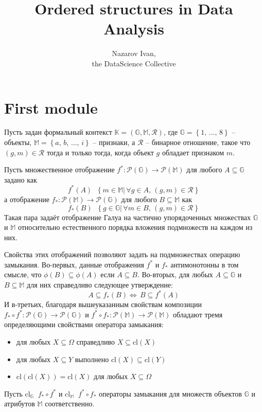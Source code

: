 \documentclass[a4paper]{article}
\title{Ordered structures in Data Analysis}
\author{Nazarov Ivan, \rus{101мНОД(ИССА)}\\the DataScience Collective}
\newcommand{\obj}[1]{{\left\{ #1 \right \}}}
\newcommand{\brac}[1]{{\left ( #1 \right )}}
\newcommand{\induc}[1]{{\left . #1 \right \vert}}
\newcommand{\Pwr}{\mathcal{P}}
\newcommand{\Ctx}{\mathbb{K}}
\newcommand{\defn}{\mathop{\overset{\Delta}{=}}\nolimits}
\begin{document}
\maketitle

\part{First module} %
\label{prt:first_module}

Пусть задан формальный контекст $\Ctx = \brac{\mathbb{G}, \mathbb{M}, \mathcal{R}}$, где $\mathbb{G} = \obj{1,\,\dots,\,8}$ -- объекты, $\mathbb{M} = \obj{a,\,b,\,\ldots,\,i}$ -- признаки, а $\mathcal{R}$ -- бинарное отношение, такое что $(g,m)\in \mathcal{R}$ тогда и только тогда, когда объект $g$ обладает признаком $m$.

Пусть множественное отображение $f^*:\Pwr(\mathbb{G})\to \Pwr(\mathbb{M})$ для любого $A\subseteq \mathbb{G}$ задано как \[f^*\brac{A}\defn \obj{\induc{ m\in \mathbb{M} }\,\forall g\in A,\,\brac{g,m}\in \mathcal{R}}\] а отображение $f_*:\Pwr(\mathbb{M})\to \Pwr(\mathbb{G})$ для любого $B\subseteq \mathbb{M}$ как \[f_*\brac{B}\defn \obj{\induc{ g\in \mathbb{G} }\,\forall m\in B,\,\brac{g,m}\in \mathcal{R}}\] Такая пара задаёт отображение Галуа на частично упорядоченных множествах $\mathbb{G}$ и $\mathbb{M}$ относительно естественного порядка вложения подмножеств на каждом из них.

Свойства этих отображений позволяют задать на подмножествах операцию замыкания. Во-первых, данные отображения $f^*$ и $f_*$ антимонотонны в том смысле, что $\phi\brac{B}\subseteq \phi\brac{A}$ если $A\subseteq B$. Во-вторых, для любых $A\subseteq \mathbb{G}$ и $B\subseteq \mathbb{M}$ для них справедливо следующее утверждение: \[A\subseteq f_*\brac{B} \Leftrightarrow\, B\subseteq f^*\brac{A}\] И в-третьих, благодаря вышеуказанным свойствам композиции $f_*\circ f^*: \Pwr(\mathbb{G})\to \Pwr(\mathbb{G})$ и $f^*\circ f_*: \Pwr(\mathbb{M})\to \Pwr(\mathbb{M})$ обладают тремя определяющими свойствами оператора замыкания: \begin{itemize}
\item для любых $X\subseteq \Omega$ справедливо $X\subseteq \text{cl}\brac{X}$
\item для любых $X\subseteq Y$ выполнено $\text{cl}\brac{X}\subseteq \text{cl}\brac{Y}$
\item $\text{cl}\brac{\text{cl}\brac{X}}=\text{cl}\brac{X}$ для любых $X\subseteq \Omega$
\end{itemize} Пусть $\text{cl}_{\mathbb{G}} \defn f_*\circ f^*$ и $\text{cl}_{\mathbb{M}} \defn f^*\circ f_*$ операторы замыкания для множеств объектов $\mathbb{G}$ и атрибутов $\mathbb{M}$ соответственно.
\end{document}
